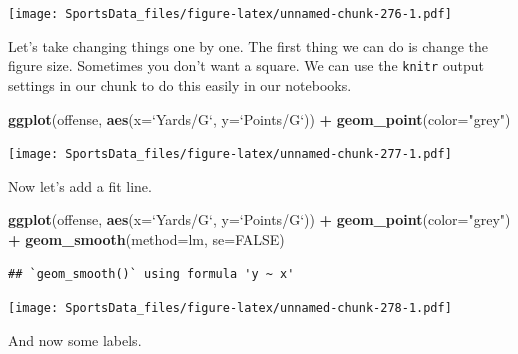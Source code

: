 \documentclass[
]{book}
\newenvironment{Shaded}{\begin{snugshade}}{\end{snugshade}}
\newcommand{\DataTypeTok}[1]{\textcolor[rgb]{0.13,0.29,0.53}{#1}}
\newcommand{\KeywordTok}[1]{\textcolor[rgb]{0.13,0.29,0.53}{\textbf{#1}}}
\newcommand{\NormalTok}[1]{#1}
\newcommand{\OperatorTok}[1]{\textcolor[rgb]{0.81,0.36,0.00}{\textbf{#1}}}
\newcommand{\OtherTok}[1]{\textcolor[rgb]{0.56,0.35,0.01}{#1}}
\newcommand{\StringTok}[1]{\textcolor[rgb]{0.31,0.60,0.02}{#1}}
\begin{document}
\texttt{[image: SportsData\_files/figure-latex/unnamed-chunk-276-1.pdf]}

Let's take changing things one by one. The first thing we can do is change the figure size. Sometimes you don't want a square. We can use the \texttt{knitr} output settings in our chunk to do this easily in our notebooks.

\begin{Shaded}
\begin{Highlighting}[]
\KeywordTok{ggplot}\NormalTok{(offense, }\KeywordTok{aes}\NormalTok{(}\DataTypeTok{x=}\StringTok{`}\DataTypeTok{Yards/G}\StringTok{`}\NormalTok{, }\DataTypeTok{y=}\StringTok{`}\DataTypeTok{Points/G}\StringTok{`}\NormalTok{)) }\OperatorTok{+}\StringTok{ }
\StringTok{  }\KeywordTok{geom_point}\NormalTok{(}\DataTypeTok{color=}\StringTok{"grey"}\NormalTok{)}
\end{Highlighting}
\end{Shaded}

\texttt{[image: SportsData\_files/figure-latex/unnamed-chunk-277-1.pdf]}

Now let's add a fit line.

\begin{Shaded}
\begin{Highlighting}[]
\KeywordTok{ggplot}\NormalTok{(offense, }\KeywordTok{aes}\NormalTok{(}\DataTypeTok{x=}\StringTok{`}\DataTypeTok{Yards/G}\StringTok{`}\NormalTok{, }\DataTypeTok{y=}\StringTok{`}\DataTypeTok{Points/G}\StringTok{`}\NormalTok{)) }\OperatorTok{+}\StringTok{ }
\StringTok{  }\KeywordTok{geom_point}\NormalTok{(}\DataTypeTok{color=}\StringTok{"grey"}\NormalTok{) }\OperatorTok{+}\StringTok{ }\KeywordTok{geom_smooth}\NormalTok{(}\DataTypeTok{method=}\NormalTok{lm, }\DataTypeTok{se=}\OtherTok{FALSE}\NormalTok{)}
\end{Highlighting}
\end{Shaded}

\begin{verbatim}
## `geom_smooth()` using formula 'y ~ x'
\end{verbatim}

\texttt{[image: SportsData\_files/figure-latex/unnamed-chunk-278-1.pdf]}

And now some labels.
\end{document}
